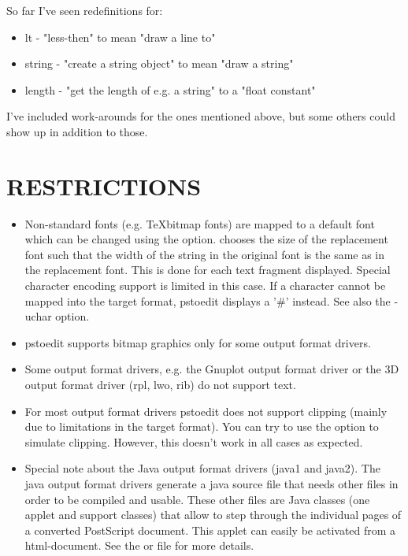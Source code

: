 \documentclass[english,a4paper]{article}
\begin{document}
So far I've seen redefinitions for:

\begin{itemize}

   \item lt - "less-then" to mean "draw a line to"
   \item string - "create a string object" to mean "draw a string"
   \item length - "get the length of e.g. a string" to a "float constant"
   
\end{itemize}

I've included work-arounds for the ones mentioned above, but some others
could show up in addition to those.


\section{RESTRICTIONS}

\begin{itemize}
\item Non-standard fonts (e.g. \TeX bitmap fonts) are mapped to a default font which
can be changed using the  option.  chooses the size of
the replacement font such that the width of the string in the original font is
the same as in the replacement font. This is done for each text fragment
displayed. Special character encoding support is limited in this case. If a
character cannot be mapped into the target format, pstoedit displays a '\#'
instead. See also the -uchar option.

\item pstoedit supports bitmap graphics only for some output format drivers.

\item Some output format drivers, e.g. the Gnuplot output format driver or the 3D output format driver (rpl, lwo, rib) do not support text.

\item For most output format drivers pstoedit does not support clipping (mainly due to limitations in the target format). You can try to use the
 option to simulate clipping. However, this doesn't work in all cases
as expected.

\item Special note about the Java output format drivers (java1 and java2).
The java output format drivers generate a java source file that needs other files in
order to be compiled and usable. These other files are Java classes (one
applet and support classes) that allow to step through the individual pages
of a converted PostScript document. This applet can easily be activated from
a html-document. See the  or 
 file for more details.
 
\end{itemize}
\end{document}
